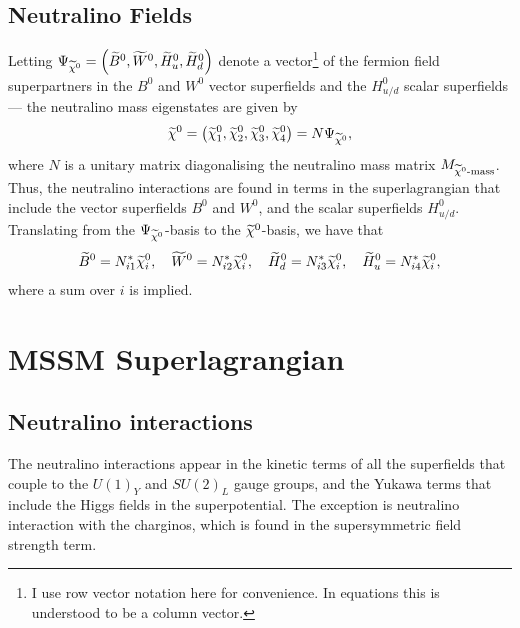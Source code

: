 \documentclass[english, notitlepage]{article}
\begin{document}
    \subsection{Neutralino Fields}
        Letting $\Psi_{\nino} = \pclosed{\bino, \wino, \hinou, \hinod}$ denote a
        vector\footnote{I use row vector notation here for convenience. In equations
            this is understood to be a column vector.} of the fermion field superpartners
        in the $B^0$ and $W^0$ vector superfields and the $H^0_{u/d}$ scalar superfields --- the
        neutralino mass eigenstates are given by
        \begin{align}
            \nino = \pclosed{\nino[1], \nino[2], \nino[3], \nino[4]} = N \Psi_{\nino},
        \end{align}
        where $N$ is a unitary matrix diagonalising the neutralino mass matrix $M_{\nino\text{-mass}}$. Thus, the neutralino interactions are found in terms in the superlagrangian that include the vector superfields $B^0$ and $W^0$, and the scalar superfields $H^0_{u/d}$. Translating from the $\Psi_{\nino}$-basis to the $\nino$-basis, we have that
        \begin{align}
            \bino = N_{i1}^* \nino[i],\quad \wino = N_{i2}^* \nino[i],\quad \hinod = N_{i3}^* \nino[i],\quad \hinou = N_{i4}^* \nino[i],
        \end{align}
        where a sum over $i$ is implied.

\section{MSSM Superlagrangian}

    \subsection{Neutralino interactions}
        The neutralino interactions appear in the kinetic terms of all the superfields
        that couple to the $U(1)_Y$ and $SU(2)_L$ gauge groups, and the Yukawa terms
        that include the Higgs fields in the superpotential. The exception is neutralino interaction with the charginos, which is found in the supersymmetric field strength term.
\end{document}
